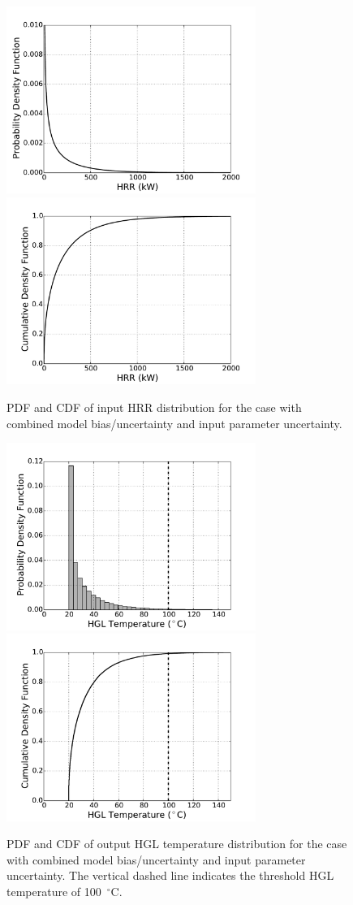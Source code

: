 \documentclass[12pt]{article}
\begin{document}
\begin{figure}[p]
\includegraphics[width=3.2in]{Figures/input_PDF}
\includegraphics[width=3.2in]{Figures/input_CDF}
\caption{PDF and CDF of input HRR distribution for the case with combined model bias/uncertainty and input parameter uncertainty.}
\label{fig:case_3_input_distributions}
\end{figure}

\begin{figure}[p]
\includegraphics[width=3.2in]{Figures/output_PDF_3_combined}
\includegraphics[width=3.2in]{Figures/output_CDF_3_combined}
\caption{PDF and CDF of output HGL temperature distribution for the case with combined model bias/uncertainty and input parameter uncertainty. The vertical dashed line indicates the threshold HGL temperature of 100~$^\circ$C.}
\label{fig:case_3_output_distributions}
\end{figure}
\end{document}
